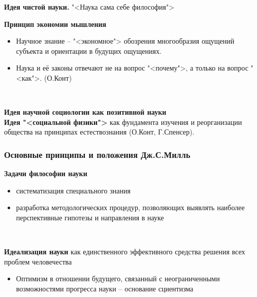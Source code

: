\documentclass[main.tex]{subfiles}
\begin{document}
{\parindent0pt
\textbf{Идея чистой науки.} "<Наука сама себе философия">
}
\ \\

{\parindent0pt
\textbf{Принцип экономии мышления}
\begin{itemize}[nosep,leftmargin=0.5cm]
\item Научное знание -- "<экономное"> обозрения многообразия ощущений субъекта и ориентации в будущих ощущениях.
\item Наука и её законы отвечают не на вопрос "<почему">, а только на вопрос "<как">. (О.Конт)
\end{itemize}
}
\ 

{\parindent0pt
\textbf{Идея научной социологии как позитивной науки}
}
\ \\

{\parindent0pt
\textbf{Идея "<социальной физики">} как фундамента изучения и реорганизации общества на принципах естествознания (О.Конт, Г.Спенсер).
}



\subsubsection{Основные принципы и положения Дж.С.Милль}

{\parindent0pt
\textbf{Задачи философии науки}
\begin{itemize}[nosep,leftmargin=0.5cm]
\item систематизация специального знания
\item разработка методологических процедур, позволяющих выявлять наиболее перспективные гипотезы и направления в науке
\end{itemize}
}
\ 

{\parindent0pt
\textbf{Идеализация науки} как единственного эффективного средства решения всех проблем человечества
\begin{itemize}[nosep,leftmargin=0.5cm]
\item Оптимизм в отношении будущего, связанный с неограниченными возможностями прогресса науки -- основание сциентизма
\end{itemize}
}
\ 
\end{document}
